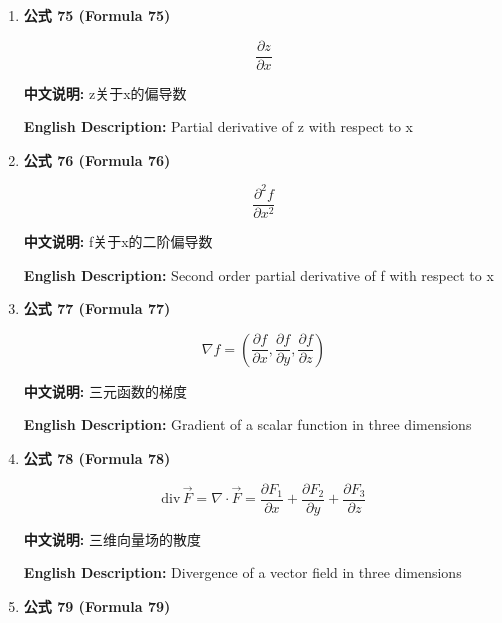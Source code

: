 \documentclass[12pt,a4paper]{article}
\begin{document}
\begin{enumerate}[leftmargin=*]
\item \textbf{公式 75 (Formula 75)}

\begin{equation}
\frac{\partial z}{\partial x}
\end{equation}

\textbf{中文说明:} z关于x的偏导数

\textbf{English Description:} Partial derivative of z with respect to x

\vspace{0.5cm}

\item \textbf{公式 76 (Formula 76)}

\begin{equation}
\frac{\partial^2 f}{\partial x^2}
\end{equation}

\textbf{中文说明:} f关于x的二阶偏导数

\textbf{English Description:} Second order partial derivative of f with respect to x

\vspace{0.5cm}

\item \textbf{公式 77 (Formula 77)}

\begin{equation}
\nabla f = \left(\frac{\partial f}{\partial x}, \frac{\partial f}{\partial y}, \frac{\partial f}{\partial z}\right)
\end{equation}

\textbf{中文说明:} 三元函数的梯度

\textbf{English Description:} Gradient of a scalar function in three dimensions

\vspace{0.5cm}

\item \textbf{公式 78 (Formula 78)}

\begin{equation}
\text{div}\, \vec{F} = \nabla \cdot \vec{F} = \frac{\partial F_1}{\partial x} + \frac{\partial F_2}{\partial y} + \frac{\partial F_3}{\partial z}
\end{equation}

\textbf{中文说明:} 三维向量场的散度

\textbf{English Description:} Divergence of a vector field in three dimensions

\vspace{0.5cm}

\item \textbf{公式 79 (Formula 79)}


\end{enumerate}
\end{document}
